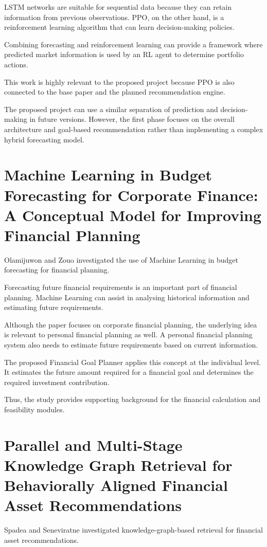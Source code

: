 LSTM networks are suitable for sequential data because they can retain information from previous observations. PPO, on the other hand, is a reinforcement learning algorithm that can learn decision-making policies.

Combining forecasting and reinforcement learning can provide a framework where predicted market information is used by an RL agent to determine portfolio actions.

This work is highly relevant to the proposed project because PPO is also connected to the base paper and the planned recommendation engine.

The proposed project can use a similar separation of prediction and decision-making in future versions. However, the first phase focuses on the overall architecture and goal-based recommendation rather than implementing a complex hybrid forecasting model.

\section{Machine Learning in Budget Forecasting for Corporate Finance: A Conceptual Model for Improving Financial Planning}
Olamijuwon and Zouo investigated the use of Machine Learning in budget forecasting for financial planning.

Forecasting future financial requirements is an important part of financial planning. Machine Learning can assist in analysing historical information and estimating future requirements.

Although the paper focuses on corporate financial planning, the underlying idea is relevant to personal financial planning as well. A personal financial planning system also needs to estimate future requirements based on current information.

The proposed Financial Goal Planner applies this concept at the individual level. It estimates the future amount required for a financial goal and determines the required investment contribution.

Thus, the study provides supporting background for the financial calculation and feasibility modules.

\section{Parallel and Multi-Stage Knowledge Graph Retrieval for Behaviorally Aligned Financial Asset Recommendations}
Spadea and Seneviratne investigated knowledge-graph-based retrieval for financial asset recommendations.


